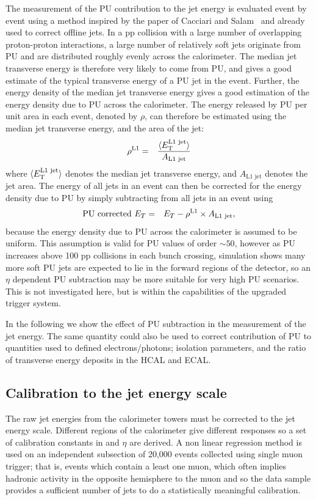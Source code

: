 The measurement of the PU contribution to the jet energy 
is evaluated event by event using a method inspired by the paper of 
Cacciari and Salam~\cite{rho_jetarea} and already used to correct offline jets.
In a pp collision with a large number of overlapping proton-proton interactions, 
a large number of relatively soft jets originate from PU and are distributed roughly 
evenly across the calorimeter.  
The median jet transverse energy is therefore very likely to come from PU, and gives a good estimate of the typical transverse energy of a \ac{PU} jet in the event.
Further, the energy density of the median jet transverse energy gives a good estimation of the energy density due to \ac{PU} across the calorimeter.
The energy released by \ac{PU} per unit area in each event, denoted by $\rho$, can therefore be estimated using the median jet transverse energy, and the area of the jet:
\begin{eqnarray}
 \rho^{\rm L1} &=& \frac{ \langle E^{\text{L1 jet}}_{\rm T} \rangle }{A_{\text{L1 jet}}}
\end{eqnarray}
where $\langle E^{\text{L1 jet}}_{\rm T} \rangle$ denotes the median jet transverse energy, and $A_{\text{L1 jet}}$ denotes the jet area.
The energy of all jets in an event can then be corrected for the energy density due to \ac{PU} by
simply subtracting from all jets in an event using
\begin{eqnarray}
 \text{PU corrected }E_{T} &=& E_{T} - \rho^{\rm L1} \times A_{\text{L1 jet}} ,
 \label{eqn:PUsub}
\end{eqnarray}
because the energy density due to \ac{PU} across the calorimeter is assumed to be uniform. 
This assumption is valid for \ac{PU} values of order $\sim50$, however as \ac{PU} increases above 100 pp collisions in each bunch crossing, simulation shows many more soft \ac{PU} jets are expected to lie in the forward regions of the detector, so an $\eta$ dependent \ac{PU} subtraction may be more suitable for very high \ac{PU} scenarios.
This is not investigated here, but is within the capabilities of the upgraded trigger system.

In the following we show the effect of PU subtraction in the measurement of the
jet energy. The same quantity could also be used to correct contribution of \ac{PU} to quantities used to defined electrons/photons; isolation parameters, and the ratio of transverse energy deposits in the \ac{HCAL} and \ac{ECAL}.


\subsection{Calibration to the jet energy scale \label{jet_calib}}
The raw jet energies from the calorimeter towers must be corrected to the jet energy scale. 
Different regions of the calorimeter give different responses so a set of calibration constants 
in \pt and $\eta$ are derived. %
A non linear regression method is used on an independent subsection of 
20,000 events collected using single muon trigger; that is, events which contain a least one muon, 
which often implies hadronic activity in the opposite hemisphere to the muon and so the data sample provides a sufficient number of jets to do a statistically meaningful calibration. 

